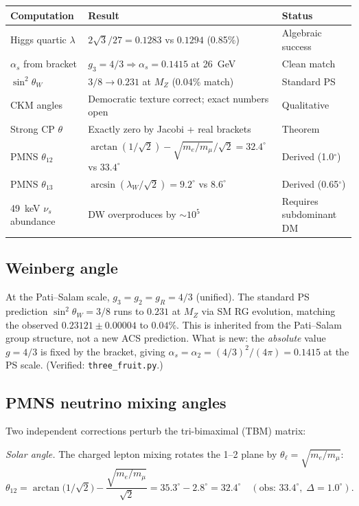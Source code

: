 \documentclass[11pt,a4paper]{article}
\theoremstyle{plain}
\theoremstyle{definition}
\theoremstyle{remark}
\begin{document}
\medskip
\begin{center}
\begin{tabular}{lll}
\toprule
Computation & Result & Status \\
\midrule
Higgs quartic $\lambda$ & $2\sqrt{3}/27 = 0.1283$ vs $0.1294$ (0.85\%) & Algebraic success \\
$\alpha_s$ from bracket & $g_3 = 4/3 \Rightarrow \alpha_s = 0.1415$ at 26~GeV & Clean match \\
$\sin^2\theta_W$ & $3/8 \to 0.231$ at $M_Z$ (0.04\% match) & Standard PS \\
CKM angles & Democratic texture correct; exact numbers open & Qualitative \\
Strong CP $\theta$ & Exactly zero by Jacobi + real brackets & Theorem \\
PMNS $\theta_{12}$ & $\arctan(1/\!\sqrt{2}) - \sqrt{m_e/m_\mu}/\!\sqrt{2} = 32.4^\circ$ vs $33.4^\circ$ & Derived (1.0$^\circ$) \\
PMNS $\theta_{13}$ & $\arcsin(\lambda_W/\!\sqrt{2}) = 9.2^\circ$ vs $8.6^\circ$ & Derived (0.65$^\circ$) \\
49~keV $\nu_s$ abundance & DW overproduces by $\sim 10^5$ & Requires subdominant DM \\
\bottomrule
\end{tabular}
\end{center}

\subsection*{Weinberg angle}

At the Pati--Salam scale, $g_3 = g_2 = g_R = 4/3$ (unified).
The standard PS prediction $\sin^2\theta_W = 3/8$ runs to
$0.231$ at $M_Z$ via SM RG evolution, matching the observed
$0.23121 \pm 0.00004$ to $0.04\%$.  This is inherited from
the Pati--Salam group structure, not a new ACS prediction.
What is new: the \emph{absolute} value $g = 4/3$ is fixed by
the bracket, giving $\alpha_s = \alpha_2 = (4/3)^2/(4\pi) = 0.1415$
at the PS scale.
(Verified: \texttt{three\_fruit.py}.)

\subsection*{PMNS neutrino mixing angles}

Two independent corrections perturb the tri-bimaximal (TBM) matrix:

\textit{Solar angle.}
The charged lepton mixing rotates the 1--2 plane by
$\theta_\ell = \sqrt{m_e/m_\mu}$:
\[
  \theta_{12} = \arctan\!\bigl(1/\!\sqrt{2}\bigr) - \frac{\sqrt{m_e/m_\mu}}{\sqrt{2}}
  = 35.3^\circ - 2.8^\circ = 32.4^\circ
  \quad(\text{obs: } 33.4^\circ,\; \Delta = 1.0^\circ).
\]
\end{document}
